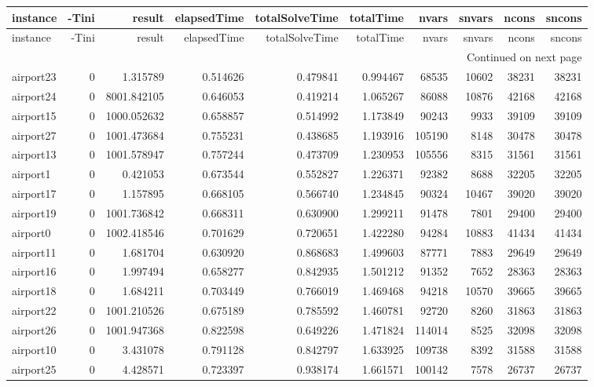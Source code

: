 
\begin{longtable}{|l|r|r|r|r|r|r|r|r|r|}
\toprule
instance & -Tini & result & elapsedTime & totalSolveTime & totalTime & nvars & snvars & ncons & sncons \\
\midrule
\endfirsthead
\toprule
instance & -Tini & result & elapsedTime & totalSolveTime & totalTime & nvars & snvars & ncons & sncons \\
\midrule
\endhead
\midrule
\multicolumn{10}{r}{Continued on next page} \\
\midrule
\endfoot
\bottomrule
\endlastfoot
airport23 & 0 & 1.315789 & 0.514626 & 0.479841 & 0.994467 & 68535 & 10602 & 38231 & 38231 \\
airport24 & 0 & 8001.842105 & 0.646053 & 0.419214 & 1.065267 & 86088 & 10876 & 42168 & 42168 \\
airport15 & 0 & 1000.052632 & 0.658857 & 0.514992 & 1.173849 & 90243 & 9933 & 39109 & 39109 \\
airport27 & 0 & 1001.473684 & 0.755231 & 0.438685 & 1.193916 & 105190 & 8148 & 30478 & 30478 \\
airport13 & 0 & 1001.578947 & 0.757244 & 0.473709 & 1.230953 & 105556 & 8315 & 31561 & 31561 \\
airport1 & 0 & 0.421053 & 0.673544 & 0.552827 & 1.226371 & 92382 & 8688 & 32205 & 32205 \\
airport17 & 0 & 1.157895 & 0.668105 & 0.566740 & 1.234845 & 90324 & 10467 & 39020 & 39020 \\
airport19 & 0 & 1001.736842 & 0.668311 & 0.630900 & 1.299211 & 91478 & 7801 & 29400 & 29400 \\
airport0 & 0 & 1002.418546 & 0.701629 & 0.720651 & 1.422280 & 94284 & 10883 & 41434 & 41434 \\
airport11 & 0 & 1.681704 & 0.630920 & 0.868683 & 1.499603 & 87771 & 7883 & 29649 & 29649 \\
airport16 & 0 & 1.997494 & 0.658277 & 0.842935 & 1.501212 & 91352 & 7652 & 28363 & 28363 \\
airport18 & 0 & 1.684211 & 0.703449 & 0.766019 & 1.469468 & 94218 & 10570 & 39665 & 39665 \\
airport22 & 0 & 1001.210526 & 0.675189 & 0.785592 & 1.460781 & 92720 & 8260 & 31863 & 31863 \\
airport26 & 0 & 1001.947368 & 0.822598 & 0.649226 & 1.471824 & 114014 & 8525 & 32098 & 32098 \\
airport10 & 0 & 3.431078 & 0.791128 & 0.842797 & 1.633925 & 109738 & 8392 & 31588 & 31588 \\
airport25 & 0 & 4.428571 & 0.723397 & 0.938174 & 1.661571 & 100142 & 7578 & 26737 & 26737 \\

\end{longtable}

